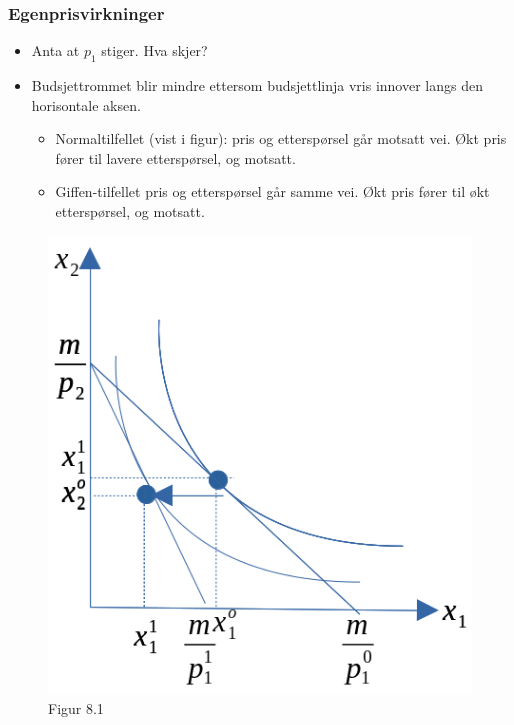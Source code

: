 \documentclass[
  letterpaper,
  DIV=11,
  numbers=noendperiod]{scrartcl}
\providecommand{\tightlist}{%
  \setlength{\itemsep}{0pt}\setlength{\parskip}{0pt}}\usepackage{longtable,booktabs,array}
\begin{document}
\subsubsection{Egenprisvirkninger}\label{egenprisvirkninger}

\begin{itemize}
\tightlist
\item
  Anta at \(p_1\) stiger. Hva skjer?
\item
  Budsjettrommet blir mindre ettersom budsjettlinja vris innover langs
  den horisontale aksen.

  \begin{itemize}
  \tightlist
  \item
    Normaltilfellet (vist i figur): pris og etterspørsel går motsatt
    vei. Økt pris fører til lavere etterspørsel, og motsatt.
  \item
    Giffen-tilfellet pris og etterspørsel går samme vei. Økt pris fører
    til økt etterspørsel, og motsatt.
  \end{itemize}
\end{itemize}

\begin{figure}[H]

{\centering \includegraphics[width=1\textwidth,height=\textheight]{drawio/egenel.png}

}

\caption{Figur 8.1}

\end{figure}%
\end{document}
